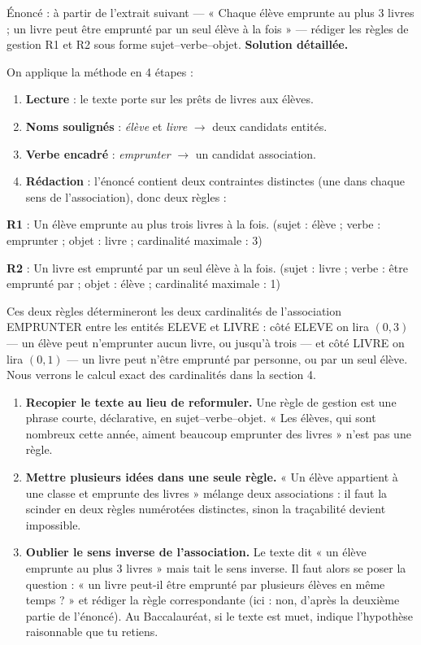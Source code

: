 \documentclass[11pt]{article}
\begin{document}
\begin{exoresolu}
Énoncé : à partir de l'extrait suivant — « Chaque élève emprunte au plus 3 livres ; un livre peut être emprunté par un seul élève à la fois » — rédiger les règles de gestion R1 et R2 sous forme sujet--verbe--objet.
\tcblower
\textbf{Solution détaillée.}

On applique la méthode en 4 étapes :
\begin{enumerate}
\item \textbf{Lecture} : le texte porte sur les prêts de livres aux élèves.
\item \textbf{Noms soulignés} : \emph{élève} et \emph{livre} $\rightarrow$ deux candidats entités.
\item \textbf{Verbe encadré} : \emph{emprunter} $\rightarrow$ un candidat association.
\item \textbf{Rédaction} : l'énoncé contient deux contraintes distinctes (une dans chaque sens de l'association), donc deux règles :
\end{enumerate}
\textbf{R1} : Un élève emprunte au plus trois livres à la fois. (sujet : élève ; verbe : emprunter ; objet : livre ; cardinalité maximale : 3)

\textbf{R2} : Un livre est emprunté par un seul élève à la fois. (sujet : livre ; verbe : être emprunté par ; objet : élève ; cardinalité maximale : 1)

Ces deux règles détermineront les deux cardinalités de l'association EMPRUNTER entre les entités ELEVE et LIVRE : côté ELEVE on lira $(0, 3)$ — un élève peut n'emprunter aucun livre, ou jusqu'à trois — et côté LIVRE on lira $(0, 1)$ — un livre peut n'être emprunté par personne, ou par un seul élève. Nous verrons le calcul exact des cardinalités dans la section 4.
\end{exoresolu}

\begin{attention}
\begin{enumerate}
\item \textbf{Recopier le texte au lieu de reformuler.} Une règle de gestion est une phrase courte, déclarative, en sujet--verbe--objet. « Les élèves, qui sont nombreux cette année, aiment beaucoup emprunter des livres » n'est pas une règle.
\item \textbf{Mettre plusieurs idées dans une seule règle.} « Un élève appartient à une classe et emprunte des livres » mélange deux associations : il faut la scinder en deux règles numérotées distinctes, sinon la traçabilité devient impossible.
\item \textbf{Oublier le sens inverse de l'association.} Le texte dit « un élève emprunte au plus 3 livres » mais tait le sens inverse. Il faut alors se poser la question : « un livre peut-il être emprunté par plusieurs élèves en même temps ? » et rédiger la règle correspondante (ici : non, d'après la deuxième partie de l'énoncé). Au Baccalauréat, si le texte est muet, indique l'hypothèse raisonnable que tu retiens.
\end{enumerate}
\end{attention}
\end{document}
